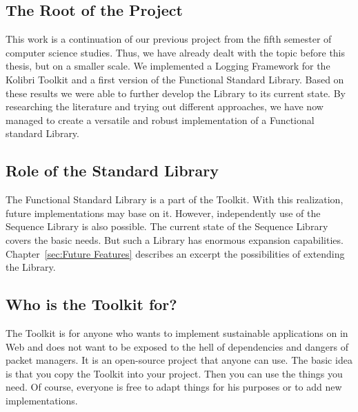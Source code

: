 \subsection{The Root of the Project}
\label{The Root of the Project}
This work is a continuation of our previous project from the fifth semester of
computer science studies. Thus, we have already dealt with the topic before
this thesis, but on a smaller scale. We implemented a Logging Framework for the
Kolibri Toolkit and a first version of the Functional Standard Library. Based
on these results we were able to further develop the Library to its current
state. By researching the literature and trying out different approaches, we
have now managed to create a versatile and robust implementation of a
Functional standard Library.

\subsection{Role of the Standard Library}
\label{sub:Role of the Standard Library}
The Functional Standard Library is a part of the Toolkit. With
this realization, future implementations may base on it. However, independently
use of the Sequence Library is also possible. The current state of the Sequence 
Library covers the basic needs. But such a Library has enormous expansion capabilities.
Chapter~\ref{sec:Future Features} describes an excerpt the possibilities of extending the Library.

\subsection{Who is the Toolkit for?}
\label{sub:Who is the Toolkit for?}
The Toolkit is for anyone who wants to implement sustainable applications on
in Web and does not want to be exposed to the hell of dependencies and dangers
of packet managers. It is an open-source project that
anyone can use. The basic idea is that you copy the Toolkit into your project.
Then you can use the things you need. Of course, everyone is free to adapt
things for his purposes or to add new implementations.

